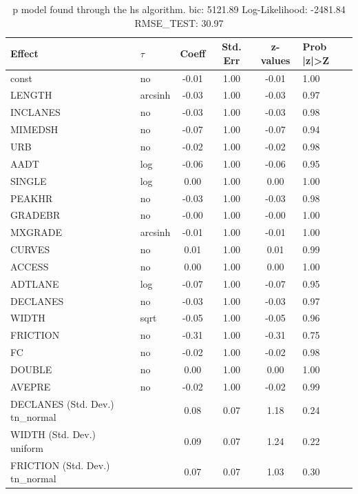 \begin{table}
	\caption{p model found through the hs algorithm. bic: 5121.89 Log-Likelihood: -2481.84 RMSE_TEST: 30.97}
	\begin{center}
		\begin{tabular}{|l|l|c|c|c|l|}
			\hline
			Effect & $\tau$ & Coeff & Std. Err & z-values & Prob |z|>Z \\
			\hline
			const & no & -0.01 & 1.00 & -0.01 & 1.00 \\
			\hline
			LENGTH & arcsinh & -0.03 & 1.00 & -0.03 & 0.97 \\
			\hline
			INCLANES & no & -0.03 & 1.00 & -0.03 & 0.98 \\
			\hline
			MIMEDSH & no & -0.07 & 1.00 & -0.07 & 0.94 \\
			\hline
			URB & no & -0.02 & 1.00 & -0.02 & 0.98 \\
			\hline
			AADT & log & -0.06 & 1.00 & -0.06 & 0.95 \\
			\hline
			SINGLE & log & 0.00 & 1.00 & 0.00 & 1.00 \\
			\hline
			PEAKHR & no & -0.03 & 1.00 & -0.03 & 0.98 \\
			\hline
			GRADEBR & no & -0.00 & 1.00 & -0.00 & 1.00 \\
			\hline
			MXGRADE & arcsinh & -0.01 & 1.00 & -0.01 & 1.00 \\
			\hline
			CURVES & no & 0.01 & 1.00 & 0.01 & 0.99 \\
			\hline
			ACCESS & no & 0.00 & 1.00 & 0.00 & 1.00 \\
			\hline
			ADTLANE & log & -0.07 & 1.00 & -0.07 & 0.95 \\
			\hline
			DECLANES & no & -0.03 & 1.00 & -0.03 & 0.97 \\
			\hline
			WIDTH & sqrt & -0.05 & 1.00 & -0.05 & 0.96 \\
			\hline
			FRICTION & no & -0.31 & 1.00 & -0.31 & 0.75 \\
			\hline
			FC & no & -0.02 & 1.00 & -0.02 & 0.98 \\
			\hline
			DOUBLE & no & 0.00 & 1.00 & 0.00 & 1.00 \\
			\hline
			AVEPRE & no & -0.02 & 1.00 & -0.02 & 0.99 \\
			\hline
			DECLANES (Std. Dev.) tn_normal &  & 0.08 & 0.07 & 1.18 & 0.24 \\
			\hline
			WIDTH (Std. Dev.) uniform &  & 0.09 & 0.07 & 1.24 & 0.22 \\
			\hline
			FRICTION (Std. Dev.) tn_normal &  & 0.07 & 0.07 & 1.03 & 0.30 \\

\end{tabular}
\end{center}
\end{table}
